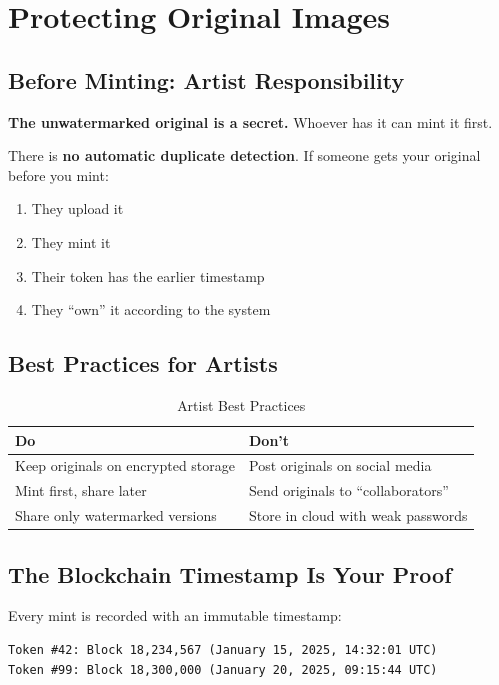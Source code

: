 \documentclass[11pt,a4paper]{article}
\begin{document}
\newpage
\section{Protecting Original Images}

\subsection{Before Minting: Artist Responsibility}

\textbf{The unwatermarked original is a secret.} Whoever has it can mint it first.

There is \textbf{no automatic duplicate detection}. If someone gets your original before you mint:

\begin{enumerate}
    \item They upload it
    \item They mint it
    \item Their token has the earlier timestamp
    \item They ``own'' it according to the system
\end{enumerate}

\subsection{Best Practices for Artists}

\begin{table}[h]
\centering
\begin{tabular}{@{}L{6cm}L{6cm}@{}}
\toprule
\textbf{Do} & \textbf{Don't} \\
\midrule
Keep originals on encrypted storage & Post originals on social media \\
Mint first, share later & Send originals to ``collaborators'' \\
Share only watermarked versions & Store in cloud with weak passwords \\
\bottomrule
\end{tabular}
\caption{Artist Best Practices}
\end{table}

\subsection{The Blockchain Timestamp Is Your Proof}

Every mint is recorded with an immutable timestamp:

\begin{verbatim}
Token #42: Block 18,234,567 (January 15, 2025, 14:32:01 UTC)
Token #99: Block 18,300,000 (January 20, 2025, 09:15:44 UTC)
\end{verbatim}
\end{document}
